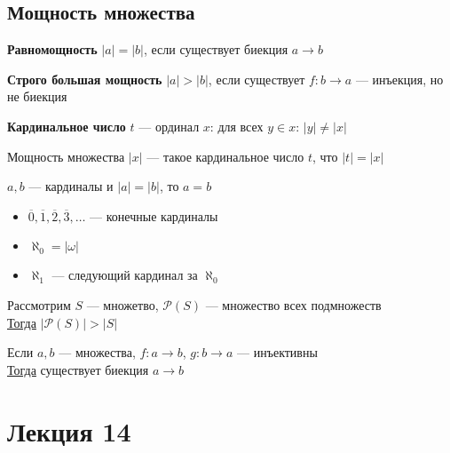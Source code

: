 \documentclass[oneside]{book}
\renewcommand{\leftmark}{}
\begin{document}
\section{Мощность множества}
\label{sec:orgc011c33}
\begin{definition}
	\textbf{Равномощность} \(|a| = |b|\), если существует биекция \(a \to b\)
	\label{orgacb1728}
\end{definition}
\begin{definition}
	\textbf{Строго большая мощность} \(|a| > |b|\), если существует \(f: b \to a\) --- инъекция, но не биекция
	\label{org38addea}
\end{definition}
\begin{definition}
	\textbf{Кардинальное число} \(t\) --- ординал \(x\): для всех \(y \in x\): \(|y| \neq |x|\)
	\label{org3cebef7}
\end{definition}
\begin{definition}
	Мощность множества \(|x|\) --- такое кардинальное число \(t\), что \(|t| = |x|\)
	\label{org2c9d0c8}
\end{definition}
\begin{lemma}
	\(a, b\) --- кардиналы и \(|a| = |b|\), то \(a = b\)
\end{lemma}
\begin{remark}
	\-
	\begin{itemize}
		\item \(\overline{0}, \overline{1}, \overline{2}, \overline{3}, \dots\) --- конечные кардиналы
		\item \(\aleph_0 = |\omega|\)
		\item \(\aleph_1\) --- следующий кардинал за \(\aleph_0\)
	\end{itemize}
	\label{orgdd449e5}
\end{remark}
\begin{theorem}[Кантора]
	Рассмотрим \(S\) --- множетво, \(\mathcal{P}(S)\) --- множество всех подмножеств \\
	\uline{Тогда} \(|\mathcal{P}(S)| > |S|\)
	\label{org494b778}
\end{theorem}
\begin{theorem}
	Если \(a, b\) --- множества, \(f: a \to b\), \(g: b \to a\) --- инъективны \\
	\uline{Тогда} существует биекция \(a \to b\)
	\label{orgae195c3}
\end{theorem}
\chapter*{Лекция 14}\renewcommand{\leftmark}{Лекция 14}
\label{sec:orgc1e0d8f}
\end{document}
